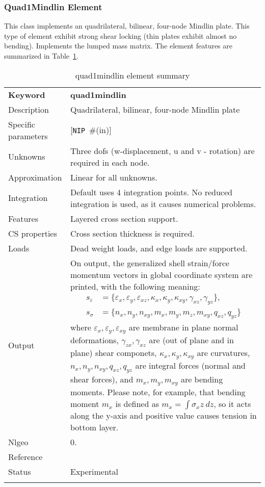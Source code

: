 \documentclass[a4paper]{article}
\newcommand{\param}[1]{\texttt{#1}} %
\newcommand{\optional}[1]{[#1]} %
\newcommand{\field}[2]{\param{#1}~\#{\tiny(#2)}} %
\newcommand{\optField}[2]{\optional{\field{#1}{#2}}}
\newcommand{\templabel}{}%
\newcommand{\tempcaption}{}%
\newcounter{nelpar}
\newenvironment{elementsummary}[5]{%
  \gdef\tempcaption{#4}%
  \gdef\templabel{#5}%
  \setcounter{nelpar}{0}%
  \begin{center} %
    \begin{table}[!htb] %
      \begin{tabular}{|l|p{9cm}|}\hline %
        {\bf Keyword} & \bf{#1}\\ %
        {Description} & {#2}\\ %
        {Specific parameters} & {#3}\\ \hline %
}{
  \\ \hline %
      \end{tabular}%
      \caption{\tempcaption}%
      \label{\templabel}%
    \end{table}%
  \end{center}%
}
\newcommand{\elementParam}[1]{%
  \ifthenelse{\value{nelpar}>0} %
             {&{#1}}%
             {\setcounter{nelpar}{1}Parameters&{#1}}%
             \\%
}
\newcommand{\elementDescription}[2]{{#1} & {#2}\\ }
\begin{document}
\subsubsection{Quad1Mindlin Element} \label{quad1mindlin}
This class implements an quadrilateral, bilinear, four-node Mindlin plate.
This type of element exhibit strong shear locking (thin plates exhibit almost no bending).
Implements the lumped mass matrix. The element features are summarized in Table~\ref{quad1mindlinsummary}.

\begin{elementsummary}{quad1mindlin}{Quadrilateral, bilinear, four-node Mindlin plate}{\optField{NIP}{in}}{quad1mindlin element summary}{quad1mindlinsummary}
\elementDescription{Unknowns}{Three dofs (w-displacement, u and v - rotation) are required in each node.}
\elementDescription{Approximation}{Linear for all unknowns.}
\elementDescription{Integration}{Default uses 4 integration points. No reduced integration is used, as it causes numerical problems.}
\elementDescription{Features}{Layered cross section support.}
\elementDescription{CS properties}{Cross section thickness is required.}
\elementDescription{Loads}{Dead weight loads, and edge loads are supported.}
\elementDescription{Output}{On output, the generalized shell strain/force momentum vectors in global coordinate system are printed, with the following meaning:
\begin{align*}
s_{\varepsilon} &= \{\varepsilon_x, \varepsilon_y, \varepsilon_{xz}, \kappa_x, \kappa_y, \kappa_{xy}, \gamma_{xz}, \gamma_{yz}\},\\
s_{\sigma} &= \{n_x, n_y, n_{xy}, m_x, m_y, m_z, m_{xy}, q_{xz}, q_{yz}\}
\end{align*}
where $\varepsilon_x, \varepsilon_y, \varepsilon_{xy}$ are membrane in plane normal deformations, $\gamma_{zx}, \gamma_{xz}$ are (out of plane and in plane) shear componets, $\kappa_x, \kappa_y, \kappa_{xy}$ are curvatures, $n_x, n_y, n_{xy}, q_{xz}, q_{yz}$ are integral forces (normal and shear forces), and $m_x, m_y, m_{xy}$ are bending moments. 
Please note, for example, that bending moment $m_x$ is defined as $m_x=\int \sigma_x z\ dz$, so it acts along the y-axis and positive value causes tension in bottom layer.}
\elementDescription{Nlgeo}{0.}
\elementDescription{Reference}{\cite{RobertCook1989}}
\elementDescription{Status}{Experimental}
\end{elementsummary}
\end{document}
